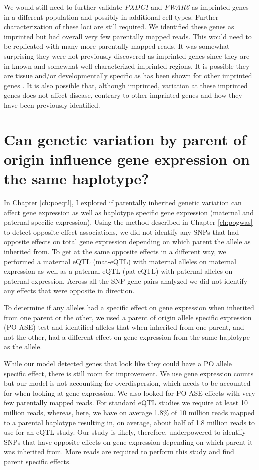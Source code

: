 We would still need to further validate \emph{PXDC1} and \emph{PWAR6} as imprinted genes in a different population and possibly in additional cell types. Further characterization of these loci are still required. We identified these genes as imprinted but had overall very few parentally mapped reads. This would need to be replicated with many more parentally mapped reads. It was somewhat surprising they were not previously discovered as imprinted genes since they are in known and somewhat well characterized imprinted regions. It is possible they are tissue and/or developmentally specific as has been shown for other imprinted genes \cite{Baran:2015cx}.  It is also possible that, although imprinted, variation at these imprinted genes does not affect disease, contrary to other imprinted genes and how they have been previously identified. 

\section{Can genetic variation by parent of origin influence gene expression on the same haplotype?}

In Chapter \ref{ch:poeqtl}, I explored if parentally inherited genetic variation can affect gene expression as well as haplotype specific gene expression (maternal and paternal specific expression). Using the method described in Chapter \ref{ch:pogwas} to detect opposite effect associations, we did not identify any SNPs that had opposite effects on total gene expression depending on which parent the allele as inherited from. To get at the same opposite effects in a different way, we performed a maternal eQTL (mat-eQTL) with maternal alleles on maternal expression as well as a paternal eQTL (pat-eQTL) with paternal alleles on paternal expression. Across all the SNP-gene pairs analyzed we did not identify any effects that were opposite in direction. 

To determine if any alleles had a specific effect on gene expression when inherited from one parent or the other, we used a parent of origin allele specific expression (PO-ASE) test and identified alleles that when inherited from one parent, and not the other, had a different effect on gene expression from the same haplotype as the allele. 

While our model detected genes that look like they could have a PO allele specific effect, there is still room for improvement. We use gene expression counts but our model is not accounting for overdispersion, which needs to be accounted for when looking at gene expression. We also looked for PO-ASE effects with very few parentally mapped reads. For standard eQTL studies we require at least 10 million reads, whereas, here, we have on average 1.8\% of 10 million reads mapped to a parental haplotype resulting in, on average, about half of 1.8 million reads to use for an eQTL study. Our study is likely, therefore, underpowered to identify SNPs that have opposite effects on gene expression depending on which parent it was inherited from. More reads are required to perform this study and find parent specific effects. 
 
